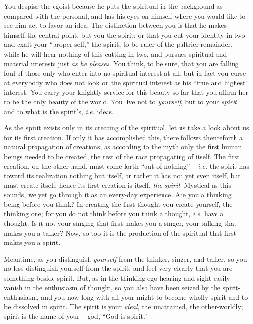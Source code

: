 You despise the egoist because he puts the spiritual in the background as 
compared with the personal, and has his eyes on himself where you would like 
to see him act to favor an idea. The distinction between you is that he makes 
himself the central point, but you the spirit; or that you cut your identity 
in two and exalt your ``proper self,'' the spirit, to be ruler of the 
paltrier remainder, while he will hear nothing of this cutting in two, and 
pursues spiritual and material interests just \textit{as he pleases}. You 
think, to be sure, that you are falling foul of those only who enter into no 
spiritual interest at all, but in fact you curse at everybody who does not 
look on the spiritual interest as his ``true and highest'' interest. You 
carry your knightly service for this beauty so far that you affirm her to be 
the only beauty of the world. You live not to \textit{yourself}, but to your 
\textit{spirit} and to what is the spirit's, \textit{i.e.} ideas.

As the spirit exists only in its creating of the spiritual, let us take a look 
about us for its first creation. If only it has accomplished this, there 
follows thenceforth a natural propagation of creations, as according to the 
myth only the first human beings needed to be created, the rest of the race 
propagating of itself. The first creation, on the other hand, must come forth 
``out of nothing'' -- \textit{i.e.} the spirit has toward its realization 
nothing but itself, or rather it has not yet even itself, but must create 
itself; hence its first creation is itself, \textit{the spirit}. Mystical as 
this sounds, we yet go through it as an every-day experience. Are you a 
thinking being before you think? In creating the first thought you create 
yourself, the thinking one; for you do not think before you think a thought, 
\textit{i.e.} have a thought. Is it not your singing that first makes you a 
singer, your talking that makes you a talker? Now, so too it is the production 
of the spiritual that first makes you a spirit.

Meantime, as you distinguish \textit{yourself} from the thinker, singer, and 
talker, so you no less distinguish yourself from the spirit, and feel very 
clearly that you are something beside spirit. But, as in the thinking ego 
hearing and sight easily vanish in the enthusiasm of thought, so you also have 
been seized by the spirit-enthusiasm, and you now long with all your might to 
become wholly spirit and to be dissolved in spirit. The spirit is your 
\textit{ideal}, the unattained, the other-worldly; spirit is the name of your 
-- god, ``God is spirit.''

